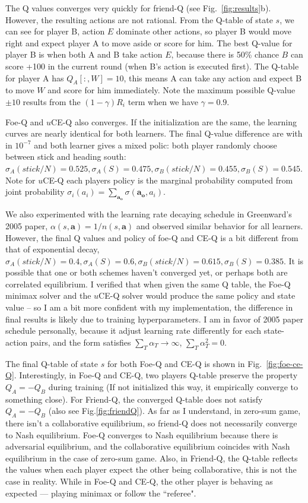 \documentclass[conference]{IEEEtran}
\begin{document}
The Q values converges very quickly for friend-Q (see Fig.~\ref{fig:results}b). However, the resulting actions are not rational. From the Q-table of state $s$, we can see for player B, action $E$ dominate other actions, so player B would move right and expect player A to move aside or score for him. The best Q-value for player B is when both A and B take action $E$, because there is 50\% chance $B$ can score +100 in the current round (when B's action is executed first). The Q-table for player A has $Q_A[:, W]=10$, this means A can take any action and expect B to move $W$ and score for him immediately. Note the maximum possible Q-value $\pm10$ results from the $(1-\gamma)R_i$ term when we have $\gamma=0.9$.

Foe-Q and $u$CE-Q also converges. If the initialization are the same, the learning curves are nearly identical for both learners. The final Q-value difference are with in $10^{-7}$ and both learner gives a mixed polic: both player randomly choose between stick and heading south: $\sigma_A(stick/N)=0.525, \sigma_A(S)=0.475, \sigma_B(stick/N)=0.455, \sigma_B(S)=0.545$. Note for $u$CE-Q each players policy is the marginal probability computed from joint probability $\sigma_i(a_i) = \sum_{\mathbf{a_o}}\sigma(\mathbf{a_o}, a_i)$.

We also experimented with the learning rate decaying schedule in Greenward's 2005 paper, $\alpha(s,\mathbf{a}) = 1/n(s,\mathbf{a})$ and observed similar behavior for all learners. However, the final Q values and policy of foe-Q and CE-Q is a bit different from that of exponential decay, $\sigma_A(stick/N)=0.4, \sigma_A(S)=0.6, \sigma_B(stick/N)=0.615, \sigma_B(S)=0.385$. It is possible that one or both schemes haven't converged yet, or perhaps both are correlated equilibrium. I verified that when given the same Q table, the Foe-Q minimax solver and the $u$CE-Q solver would produce the same policy and state value -- so I am a bit more confident with my implementation, the difference in final results is likely due to training hyperparameters. I am in favor of 2005 paper schedule personally, because it adjust learning rate differently for each state-action pairs, and the form satisfies $\sum_T \alpha_T \rightarrow \infty$, $\sum_T \alpha_T^2 =0$.

The final Q-table of state $s$ for both Foe-Q and CE-Q is shown in Fig.~\ref{fig:foe-ce-Q}. Interestingly, in Foe-Q and CE-Q, two players Q-table preserve the property $Q_A = -Q_B$ during training (If not initialized this way, it empirically converge to something close). For Friend-Q, the converged Q-table does not satisfy $Q_A = -Q_B$ (also see Fig.\ref{fig:friendQ}). As far as I understand, in zero-sum game, there isn't a collaborative equilibrium, so friend-Q does not necessarily converge to Nash equilibrium. Foe-Q converges to Nash equilibrium because there is adversarial equilibrium, and the collaborative equilibrium coincides with Nash equilibrium in the case of zero-sum game. Also, in Friend-Q, the Q-table reflects the values when each player expect the other being collaborative, this is not the case in reality. While in Foe-Q and CE-Q, the other player is behaving as expected --- playing minimax or follow the ``referee".
\end{document}
